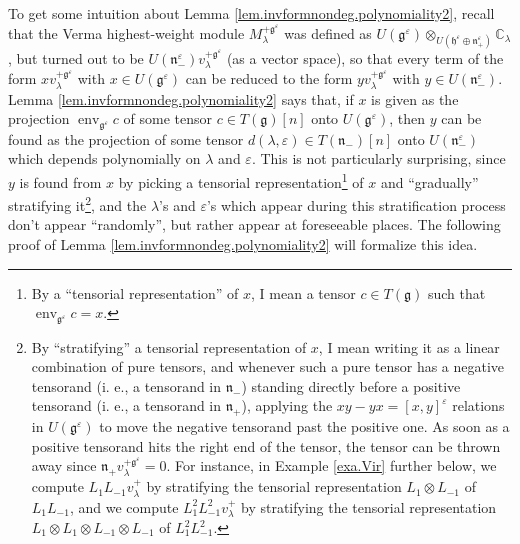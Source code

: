 \documentclass[etingof-lie.tex]{subfiles}
\begin{document}
To get some intuition about Lemma \ref{lem.invformnondeg.polynomiality2},
recall that the Verma highest-weight module $M_{\lambda}^{+\mathfrak{g}%
^{\varepsilon}}$ was defined as $U\left(  \mathfrak{g}^{\varepsilon}\right)
\otimes_{U\left(  \mathfrak{h}^{\varepsilon}\oplus\mathfrak{n}_{+}%
^{\varepsilon}\right)  }\mathbb{C}_{\lambda}$, but turned out to be $U\left(
\mathfrak{n}_{-}^{\varepsilon}\right)  v_{\lambda}^{+\mathfrak{g}%
^{\varepsilon}}$ (as a vector space), so that every term of the form
$xv_{\lambda}^{+\mathfrak{g}^{\varepsilon}}$ with $x\in U\left(
\mathfrak{g}^{\varepsilon}\right)  $ can be reduced to the form $yv_{\lambda
}^{+\mathfrak{g}^{\varepsilon}}$ with $y\in U\left(  \mathfrak{n}%
_{-}^{\varepsilon}\right)  $. Lemma \ref{lem.invformnondeg.polynomiality2}
says that, if $x$ is given as the projection $\operatorname*{env}%
\nolimits_{\mathfrak{g}^{\varepsilon}}c$ of some tensor $c\in T\left(
\mathfrak{g}\right)  \left[  n\right]  $ onto $U\left(  \mathfrak{g}%
^{\varepsilon}\right)  $, then $y$ can be found as the projection of some
tensor $d\left(  \lambda,\varepsilon\right)  \in T\left(  \mathfrak{n}%
_{-}\right)  \left[  n\right]  $ onto $U\left(  \mathfrak{n}_{-}^{\varepsilon
}\right)  $ which depends polynomially on $\lambda$ and $\varepsilon$. This is
not particularly surprising, since $y$ is found from $x$ by picking a
tensorial representation\footnote{By a ``tensorial representation'' of $x$, I
mean a tensor $c\in T\left(  \mathfrak{g}\right)  $ such that
$\operatorname*{env}\nolimits_{\mathfrak{g}^{\varepsilon}}c=x$.} of $x$ and
``gradually'' stratifying it\footnote{By ``stratifying'' a tensorial
representation of $x$, I mean writing it as a linear combination of pure
tensors, and whenever such a pure tensor has a negative tensorand (i. e., a
tensorand in $\mathfrak{n}_{-}$) standing directly before a positive tensorand
(i. e., a tensorand in $\mathfrak{n}_{+}$), applying the $xy-yx=\left[
x,y\right]  ^{\varepsilon}$ relations in $U\left(  \mathfrak{g}^{\varepsilon
}\right)  $ to move the negative tensorand past the positive one. As soon as a
positive tensorand hits the right end of the tensor, the tensor can be thrown
away since $\mathfrak{n}_{+}v_{\lambda}^{+\mathfrak{g}^{\varepsilon}}=0$. For
instance, in Example \ref{exa.Vir} further below, we compute $L_{1}%
L_{-1}v_{\lambda}^{+}$ by stratifying the tensorial representation
$L_{1}\otimes L_{-1}$ of $L_{1}L_{-1}$, and we compute $L_{1}^{2}L_{-1}%
^{2}v_{\lambda}^{+}$ by stratifying the tensorial representation $L_{1}\otimes
L_{1}\otimes L_{-1}\otimes L_{-1}$ of $L_{1}^{2}L_{-1}^{2}$.}, and the
$\lambda$'s and $\varepsilon$'s which appear during this stratification
process don't appear ``randomly'', but rather appear at foreseeable places.
The following proof of Lemma \ref{lem.invformnondeg.polynomiality2} will
formalize this idea.
\end{document}
